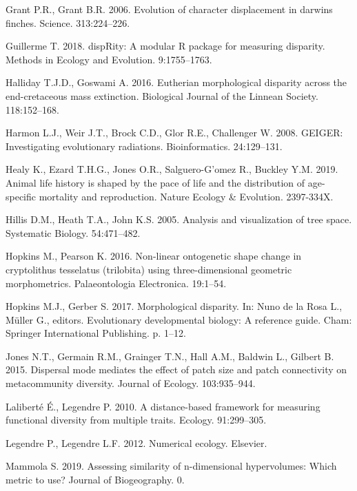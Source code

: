 \documentclass[]{article}
\begin{document}
\hypertarget{ref-grant2006}{}
Grant P.R., Grant B.R. 2006. Evolution of character displacement in
darwins finches. Science. 313:224--226.

\hypertarget{ref-disprity}{}
Guillerme T. 2018. dispRity: A modular R package for measuring
disparity. Methods in Ecology and Evolution. 9:1755--1763.

\hypertarget{ref-halliday2015}{}
Halliday T.J.D., Goswami A. 2016. Eutherian morphological disparity
across the end-cretaceous mass extinction. Biological Journal of the
Linnean Society. 118:152--168.

\hypertarget{ref-geiger2008}{}
Harmon L.J., Weir J.T., Brock C.D., Glor R.E., Challenger W. 2008.
GEIGER: Investigating evolutionary radiations. Bioinformatics.
24:129--131.

\hypertarget{ref-healy2019}{}
Healy K., Ezard T.H.G., Jones O.R., Salguero-G'omez R., Buckley Y.M.
2019. Animal life history is shaped by the pace of life and the
distribution of age-specific mortality and reproduction. Nature Ecology
\& Evolution. 2397-334X.

\hypertarget{ref-Hillis2005}{}
Hillis D.M., Heath T.A., John K.S. 2005. Analysis and visualization of
tree space. Systematic Biology. 54:471--482.

\hypertarget{ref-hopkins2016}{}
Hopkins M., Pearson K. 2016. Non-linear ontogenetic shape change in
cryptolithus tesselatus (trilobita) using three-dimensional geometric
morphometrics. Palaeontologia Electronica. 19:1--54.

\hypertarget{ref-hopkins2017}{}
Hopkins M.J., Gerber S. 2017. Morphological disparity. In: Nuno de la
Rosa L., Müller G., editors. Evolutionary developmental biology: A
reference guide. Cham: Springer International Publishing. p. 1--12.

\hypertarget{ref-jones2015}{}
Jones N.T., Germain R.M., Grainger T.N., Hall A.M., Baldwin L., Gilbert
B. 2015. Dispersal mode mediates the effect of patch size and patch
connectivity on metacommunity diversity. Journal of Ecology.
103:935--944.

\hypertarget{ref-lalibertuxe92010}{}
Laliberté É., Legendre P. 2010. A distance-based framework for measuring
functional diversity from multiple traits. Ecology. 91:299--305.

\hypertarget{ref-legendre2012}{}
Legendre P., Legendre L.F. 2012. Numerical ecology. Elsevier.

\hypertarget{ref-mammola2019}{}
Mammola S. 2019. Assessing similarity of n-dimensional hypervolumes:
Which metric to use? Journal of Biogeography. 0.
\end{document}
